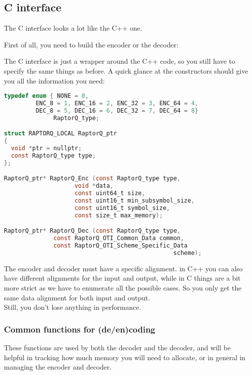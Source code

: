 \documentclass[11pt,a4paper]{refart}
\begin{document}
\subsection{C interface}
The C interface looks a lot like the C++ one.

First of all, you need to build the encoder or the decoder:

The C interface is just a wrapper around the C++ code, so you still have to specify the same things as before.
A quick glance at the constructors should give you all the information you need:

\begin{lstlisting}[language=C]
typedef enum { NONE = 0,
         ENC_8 = 1, ENC_16 = 2, ENC_32 = 3, ENC_64 = 4,
         DEC_8 = 5, DEC_16 = 6, DEC_32 = 7, DEC_64 = 8}
              RaptorQ_type;

struct RAPTORQ_LOCAL RaptorQ_ptr
{
  void *ptr = nullptr;
  const RaptorQ_type type;
};

RaptorQ_ptr* RaptorQ_Enc (const RaptorQ_type type,
                    void *data,
                    const uint64_t size,
                    const uint16_t min_subsymbol_size,
                    const uint16_t symbol_size,
                    const size_t max_memory);

RaptorQ_ptr* RaptorQ_Dec (const RaptorQ_type type,
              const RaptorQ_OTI_Common_Data common,
              const RaptorQ_OTI_Scheme_Specific_Data
                                                scheme);
\end{lstlisting}

The encoder and decoder must have a specific alignment. in C++ you can also have different
alignments for the input and output, while in C things are a bit more strict as we have to enumerate
all the possible cases. So you only get the same data alignment for both input and output.\\
Still, you don't lose anything in performance.\\

\newpage
\subsubsection{Common functions for (de/en)coding}

These functions are used by both the decoder and the decoder, and will be helpful in tracking how much memory
you will need to allocate, or in general in managing the encoder and decoder.
\end{document}
